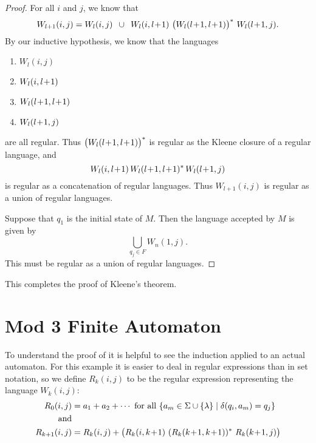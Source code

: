 \documentclass{bcthesis}
\begin{document}
\begin{proof}
		For all $i$ and $j$, we know that 
		\[
			W_{l+1}(i, j) = W_l(i, j) \enspace \cup \enspace W_l(i, l\tp1)\ \big(W_l(l\tp1, l\tp1)\big)^* \ W_l(l\tp1, j).
		\]
		By our inductive hypothesis, we know that the languages 
		\begin{enumerate}[label = (\roman*), itemsep = -0.3 ex, nolistsep]
			\item $W_l(i, j)$
			\item $W_l(i, l\!+\!1)$
			\item $W_l(l\!+\!1, l\!+\!1)$
			\item $W_l(l\!+\!1, j)$
		\end{enumerate}
		are all regular.
		Thus $\big(W_l(l\!+\!1, l\!+\!1)\big)^*$ is regular as the Kleene closure of a regular language, and 
		\[
			W_l(i, l\tp1)\, W_l(l\tp1, l\tp1)^*\, W_l(l\tp1, j)
		\] 
		is regular as a concatenation of regular languages.
		Thus $W_{l+1}(i, j)$ is regular as a union of regular languages.

		Suppose that $q_1$ is the initial state of $M$.
		Then the language accepted by $M$ is given by
		\[
			\bigcup_{q_j \in F} W_n(1, j).
		\]
		This must be regular as a union of regular languages.
	\end{proof}
	

	This completes the proof of Kleene's theorem.



\label{sec:examples}

	\section{Mod 3 Finite Automaton} %
	\label{sec:mod_3_finite_automaton}
	
		To understand the proof of  it is helpful to see the induction applied to an actual automaton.
		For this example it is easier to deal in regular expressions than in set notation, so we define $R_k(i, j)$ to be the regular expression representing the language $W_k (i, j)$:
		\begin{align*}
			R_0(i, j) &= a_1 + a_2 + \cdots \text{ for all } \{ a_m \in \Sigma \cup \{ \lambda \} \mid \delta(q_i, a_m) = q_j \} \\
			\text{and}\\
			R_{k+1}(i, j) &= R_k(i, j) + \big( R_k(i, k\tp1) \ (R_k(k\tp1, k\tp1))^* \ R_k(k\tp1, j) \big)
		\end{align*}
		
\end{document}

